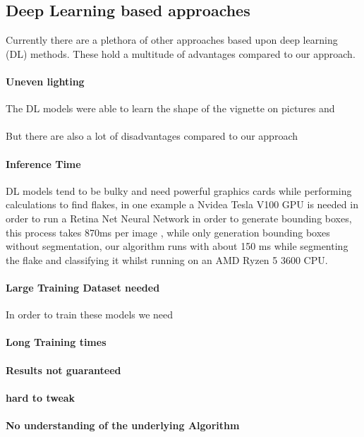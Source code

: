 \subsection{Deep Learning based approaches}
Currently there are a plethora of other approaches based upon deep learning (DL) methods.
These hold a multitude of advantages compared to our approach. 

\paragraph{Uneven lighting}
The DL models were able to learn the shape of the vignette on pictures and
\\
\\
But there are also a lot of disadvantages compared to our approach

\paragraph{Inference Time}
DL models tend to be bulky and need powerful graphics cards while performing calculations to find flakes, in one example a Nvidea Tesla V100 GPU is needed in order to run a Retina Net Neural Network in order to generate bounding boxes, this process takes 870ms per image \cite{Shin_2021}, while only generation bounding boxes without segmentation, our algorithm runs  with about 150 ms while segmenting the flake and classifying it whilst running on an AMD Ryzen 5 3600 CPU.

\paragraph{Large Training Dataset needed}
In order to train these models we need 

\paragraph{Long Training times}

\paragraph{Results not guaranteed}

\paragraph{hard to tweak}

\paragraph{No understanding of the underlying Algorithm}